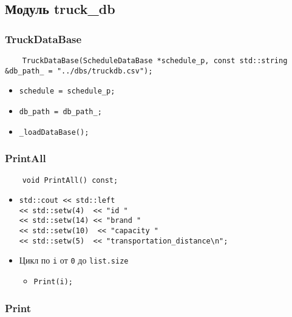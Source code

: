 \subsection{Модуль truck\_db}

\subsubsection{TruckDataBase}

\begin{lstlisting}
    TruckDataBase(ScheduleDataBase *schedule_p, const std::string &db_path_ = "../dbs/truckdb.csv");
\end{lstlisting}

\begin{itemize}
    \item \verb|schedule = schedule_p;|
    \item \verb|db_path = db_path_;|
    \item \verb|_loadDataBase();|
\end{itemize}

\subsubsection{PrintAll}

\begin{lstlisting}
    void PrintAll() const;
\end{lstlisting}

\begin{itemize}
    \item \verb|std::cout << std::left|\\
    \verb|<< std::setw(4)  << "id "|\\
    \verb|<< std::setw(14) << "brand "|\\
    \verb|<< std::setw(10)  << "capacity "|\\
    \verb|<< std::setw(5)  << "transportation_distance\n";|
    \item Цикл по \verb|i| от \verb|0| до \verb|list.size| 
        \begin{itemize}
            \item \verb|Print(i);|
        \end{itemize}
\end{itemize}

\subsubsection{Print}

